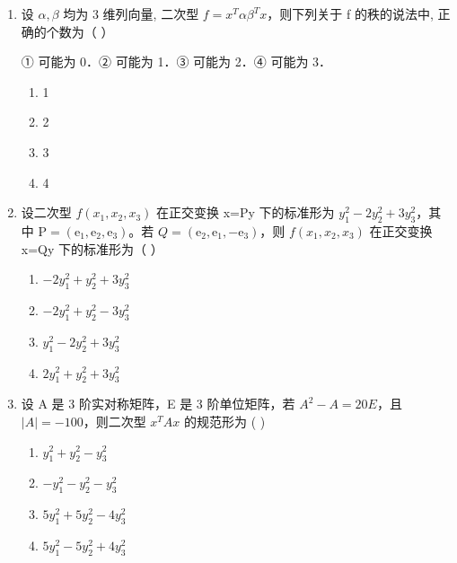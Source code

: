\documentclass[12pt, a4paper]{ctexart}
\begin{document}
\begin{enumerate}
    \item 设 $ \alpha, \beta $ 均为 3 维列向量, 二次型 $ f = x^{T} \alpha \beta^{T} x $，则下列关于 f 的秩的说法中, 正确的个数为（ \underline{\hspace{1cm}} ）
    
    ① 可能为 0．② 可能为 1．③ 可能为 2．④ 可能为 3．
    \begin{enumerate}[label=(\Alph*)]
        \item 1
        \item 2
        \item 3
        \item 4
    \end{enumerate}

    \item 设二次型 $ f(x_{1},x_{2},x_{3}) $ 在正交变换 x=Py 下的标准形为 $ y_{1}^{2}-2y_{2}^{2}+3y_{3}^{2} $，其中 $ \mathrm{P}=\left(\mathrm{e}_{1},\mathrm{e}_{2},\mathrm{e}_{3}\right) $。若 $ Q=\left(\mathrm{e}_{2},\mathrm{e}_{1},-\mathrm{e}_{3}\right) $，则 $ f(x_{1},x_{2},x_{3}) $ 在正交变换 x=Qy 下的标准形为（ \underline{\hspace{1cm}} ）
    \begin{enumerate}[label=(\Alph*)]
        \item $ -2y_{1}^{2}+y_{2}^{2}+3y_{3}^{2} $
        \item $ -2y_{1}^{2}+y_{2}^{2}-3y_{3}^{2} $
        \item $ y_{1}^{2}-2y_{2}^{2}+3y_{3}^{2} $
        \item $ 2y_{1}^{2}+y_{2}^{2}+3y_{3}^{2} $
    \end{enumerate}

    \item 设 A 是 3 阶实对称矩阵，E 是 3 阶单位矩阵，若 $ A^2 - A = 20E $，且 $ |A| = -100 $，则二次型 $ x^T A x $ 的规范形为 ( \underline{\hspace{1cm}} )
    \begin{enumerate}[label=(\Alph*)]
        \item $ y_1^2 + y_2^2 - y_3^2 $
        \item $ -y_1^2 - y_2^2 - y_3^2 $
        \item $ 5y_1^2 + 5y_2^2 - 4y_3^2 $
        \item $ 5y_1^2 - 5y_2^2 + 4y_3^2 $
    \end{enumerate}


\end{enumerate}
\end{document}
